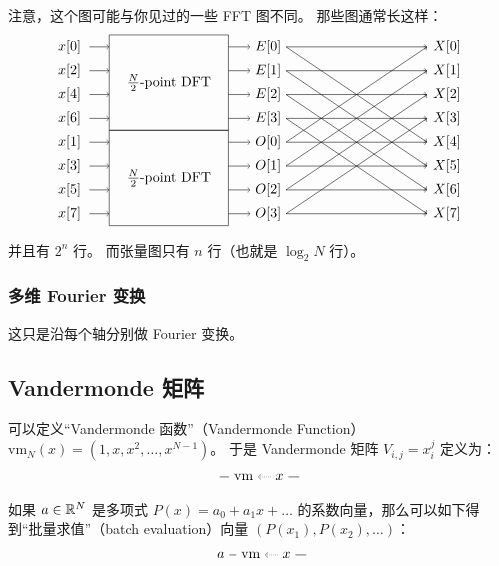 注意，这个图可能与你见过的一些 FFT 图不同。
那些图通常长这样：
\[
\begin{tikzpicture}
  \draw (0, -2.1) rectangle (3, .3) node[midway] {$\frac{N}{2}$-point DFT};
  \draw (0, -4.5) rectangle (3, -2.1) node[midway] {$\frac{N}{2}$-point DFT};

  \foreach \i in {0,2,4,6} {
    \node at (-1, - \i*0.3) {$x[\i]$};
    \draw[->] (-0.5, - \i*0.3) -- (0, - \i*0.3);
  }
  \foreach \i in {1,3,5,7} {
    \node at (-1, - \i*0.3 - 2.1) {$x[\i]$};
    \draw[->] (-0.5, - \i*0.3 - 2.1) -- (0, - \i*0.3 - 2.1);
  }
  \foreach \i in {0,1,2,3} {
    \node (E) at (4, - \i*0.6) {$E[\i]$};
    \draw[->] (3, - \i*0.6) -- (E.west);
    \draw[->] (E.east) -- (8, - \i*0.6);
    \draw[->] (E.east) -- (8, - \i*0.6 - 2.4);
  }
  \foreach \i in {0,1,2,3} {
    \node (O) at (4, - \i*0.6 - 2.4) {$O[\i]$};
    \draw[->] (3, - \i*0.6 - 2.4) -- (O.west);
    \draw[->] (O.east) -- (8, - \i*0.6);
    \draw[->] (O.east) -- (8, - \i*0.6 - 2.4);
  }
  \foreach \i in {0,...,7} {
    \node at (8.5, - \i*0.6) {$X[\i]$};
  }
\end{tikzpicture}
\]
并且有 $2^n$ 行。
而张量图只有 $n$ 行（也就是 $\log_2 N$ 行）。

\subsubsection{多维 Fourier 变换}
这只是沿每个轴分别做 Fourier 变换。

\subsection{Vandermonde 矩阵}
可以定义“Vandermonde 函数”（Vandermonde Function）$\mathrm{vm}_N(x) = (1, x, x^2, \dots, x^{N-1})$。
于是 Vandermonde 矩阵 $V_{i,j}=x_i^j$ 定义为：
\[
   \begin{tikzpicture}
      \node(vm) at (0,0) {vm};
      \node(x) at (.9,0) {$x$};
      \draw[densely dotted, ->] (x) -> (vm);
      \draw (x) -- ++(.5,0);
      \draw (vm) -- ++(-.6,0);
   \end{tikzpicture}
\]
如果 $a\in\mathbb R^N$ 是多项式 $P(x)=a_0 + a_1 x + \dots$ 的系数向量，那么可以如下得到“批量求值”（batch evaluation）向量 $(P(x_1), P(x_2), \dots)$：
\[
   \begin{tikzpicture}
      \node(a) at (-.75,0) {$a$};
      \node(vm) at (0,0) {vm};
      \node(x) at (.9,0) {$x$};
      \draw[densely dotted, ->] (x) -> (vm);
      \draw (x) -- ++(.5,0);
      \draw (vm) -- (a);
   \end{tikzpicture}
\]

